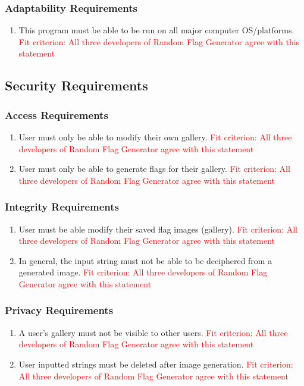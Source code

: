 \documentclass[12pt, titlepage]{article}
\begin{document}
\subsubsection{Adaptability Requirements}
\begin{enumerate}[label=MA\arabic*., resume=mas]
    \item This program must be able to be run on all major computer OS/platforms. \textcolor{red}{Fit criterion: All three developers of Random Flag Generator agree with this statement}
\end{enumerate}
\subsection{Security Requirements} 
\subsubsection{Access Requirements}
\begin{enumerate}[label=SR\arabic*., series=srs]
    \item User must only be able to modify their own gallery. \textcolor{red}{Fit criterion: All three developers of Random Flag Generator agree with this statement}
    \item User must only be able to generate flags for their gallery. \textcolor{red}{Fit criterion: All three developers of Random Flag Generator agree with this statement}
\end{enumerate}
\subsubsection{Integrity Requirements}
\begin{enumerate}[label=SR\arabic*., resume=srs]
    \item User must be able modify their saved flag images (gallery). \textcolor{red}{Fit criterion: All three developers of Random Flag Generator agree with this statement}
    \item In general, the input string must not be able to be deciphered from a generated image. \textcolor{red}{Fit criterion: All three developers of Random Flag Generator agree with this statement}
\end{enumerate}

\subsubsection{Privacy Requirements}
\begin{enumerate}[label=SR\arabic*., resume=srs]
    \item A user's gallery must not be visible to other users. \textcolor{red}{Fit criterion: All three developers of Random Flag Generator agree with this statement}
    \item User inputted strings must be deleted after image generation. \textcolor{red}{Fit criterion: All three developers of Random Flag Generator agree with this statement}
\end{enumerate}
\end{document}
